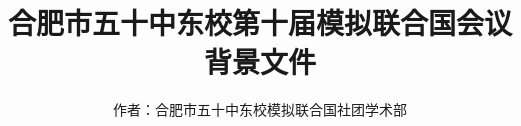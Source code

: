 \documentclass{article}
\title{合肥市五十中东校第十届模拟联合国会议\\\huge 背景文件}
\author{作者：合肥市五十中东校模拟联合国社团学术部}
\begin{document}
    \centering
    \maketitle
    \clearpage
    \tableofcontents
\end{document}
